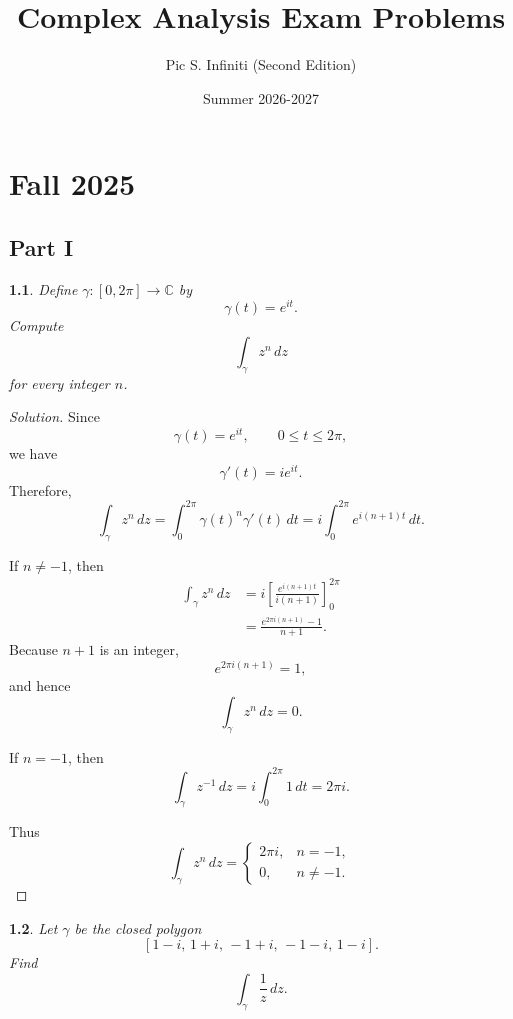 \documentclass[12pt, a4paper]{report}
\title{Complex Analysis Exam Problems}
\author{
  Pic S. Infiniti (Second Edition)
}
\date{Summer 2026-2027}
\theoremstyle{spaced}
\newtheorem{exercise}{}
\begin{document}
\hypersetup{pageanchor=false}
\maketitle

\tableofcontents

\hypersetup{pageanchor=true}
\chapter{Fall 2025}
\section{Part I}
\begin{exercise}
	Define $\gamma \colon [0,2\pi] \to \mathbb{C}$ by
	\[
		\gamma(t)=e^{it}.
	\]
	Compute
	\[
		\int_{\gamma} z^n\,dz
	\]
	for every integer $n$.
\end{exercise}
\begin{proof}[Solution]
	Since
	\[
		\gamma(t)=e^{it},\qquad 0\leq t\leq 2\pi,
	\]
	we have
	\[
		\gamma'(t)=ie^{it}.
	\]
	Therefore,
	\[
		\int_{\gamma} z^n\,dz
		=
		\int_0^{2\pi} \gamma(t)^n\gamma'(t)\,dt
		=
		i\int_0^{2\pi} e^{i(n+1)t}\,dt.
	\]

	If \(n\neq -1\), then
	\[
		\begin{aligned}
			\int_{\gamma} z^n\,dz
			 & =
			i\left[
				\frac{e^{i(n+1)t}}{i(n+1)}
			\right]_{0}^{2\pi} \\
			 & =
			\frac{e^{2\pi i(n+1)}-1}{n+1}.
		\end{aligned}
	\]
	Because \(n+1\) is an integer,
	\[
		e^{2\pi i(n+1)}=1,
	\]
	and hence
	\[
		\int_{\gamma} z^n\,dz=0.
	\]

	If \(n=-1\), then
	\[
		\int_{\gamma} z^{-1}\,dz
		=
		i\int_0^{2\pi}1\,dt
		=
		2\pi i.
	\]

	Thus
	\[
		\int_{\gamma}z^n\,dz
		=
		\begin{cases}
			2\pi i, & n=-1,     \\[4pt]
			0,      & n\neq -1.
		\end{cases}
	\]
\end{proof}

\begin{exercise}
	Let $\gamma$ be the closed polygon
	\[
		[1-i,\,1+i,\,-1+i,\,-1-i,\,1-i].
	\]
	Find
	\[
		\int_{\gamma}\frac{1}{z}\,dz.
	\]
\end{exercise}
\end{document}
